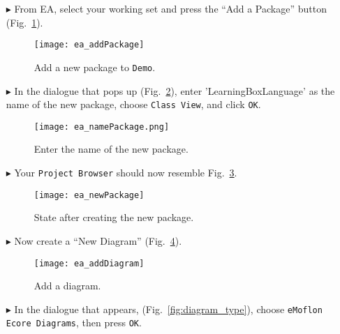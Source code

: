 \newpage
\begin{itemize}
\item[$\blacktriangleright$] From EA, select your working set and press the ``Add a Package'' button (Fig.~\ref{fig:new_package}).

\begin{figure}[htbp]
	\centering
  \texttt{[image: ea\_addPackage]}
	\caption{Add a new package to \texttt{Demo}.}
	\label{fig:new_package}
	\vspace{0.5cm}
\end{figure}

\vspace{0.5cm}

\item[$\blacktriangleright$] In the dialogue that pops up (Fig.~\ref{fig:new_package_name}), enter 'Learning\-Box\-Language' as the name of the new package,
choose \texttt{Class View},  and click \texttt{OK}.

\begin{figure}[htbp]
	\centering
    \texttt{[image: ea\_namePackage.png]}
	\caption{Enter the name of the new package.}
	\label{fig:new_package_name}
\end{figure}
\FloatBarrier

\vspace{0.5cm}

\item[$\blacktriangleright$] Your \texttt{Project Browser} should now resemble Fig.~\ref{fig:new_package_completed}.

\begin{figure}[htbp]
	\centering
  \texttt{[image: ea\_newPackage]}
	\caption{State after creating the new package.}
	\label{fig:new_package_completed}
\end{figure}
\FloatBarrier

\clearpage
\item[$\blacktriangleright$] Now create a ``New Diagram'' (Fig.~\ref{fig:diagram}).

\begin{figure}[htbp]
	\centering
  \texttt{[image: ea\_addDiagram]}
	\caption{Add a diagram.}
	\label{fig:diagram}
\end{figure}
\FloatBarrier

\item[$\blacktriangleright$] In the dialogue that appears, (Fig.~\ref{fig:diagram_type}), choose \texttt{eMoflon Ecore Diagrams}, then press \texttt{OK}.


\end{itemize}
